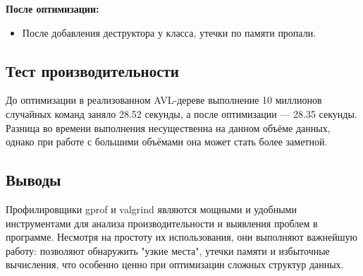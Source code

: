 \documentclass[12pt]{article}
\begin{document}
\noindent\textbf{После оптимизации:}
\begin{itemize}
    \item После добавления деструктора у класса, утечки по памяти пропали.
\end{itemize}

\subsection*{Тест производительности}

До оптимизации в реализованном AVL-дереве выполнение 10 миллионов случайных команд заняло 28.52 секунды, а после оптимизации — 28.35 секунды.
Разница во времени выполнения несущественна на данном объёме данных, однако при работе с большими объёмами она может стать более заметной.

\subsection*{Выводы}

Профилировщики gprof и valgrind являются мощными и удобными инструментами для анализа производительности и выявления проблем в программе. Несмотря на простоту их использования, они выполняют важнейшую работу: позволяют обнаружить "узкие места", утечки памяти и избыточные вычисления, что особенно ценно при оптимизации сложных структур данных.
\end{document}
